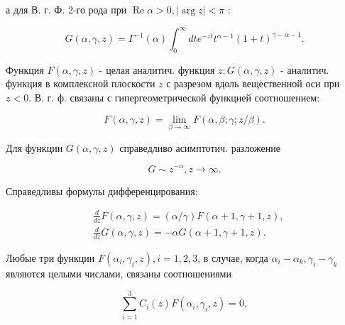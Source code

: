 \documentclass[10pt]{article}
\begin{document}
а для В. г. Ф. 2-го рода при $\operatorname{Re} \alpha>0,|\arg z|<\pi$ :



\[

G(\alpha, \gamma, z)=\Gamma^{-1}(\alpha) \int_{0}^{\infty} d t e^{-z t} t^{\alpha-1}(1+t)^{\gamma-\alpha-1} .

\]



Функция $F(\alpha, \gamma, z)$ - целая аналитич. функция $z ; G(\alpha, \gamma, z)$ - аналитич. функция в комплексной плоскости $z$ с разрезом вдоль вещественной оси при $z<0$. В. г. ф. связаны с гипергеометрической функцией соотношением:



\[

F(\alpha, \gamma, z)=\lim _{\beta \rightarrow \infty} F(\alpha, \beta ; \gamma ; z / \beta) .

\]



Для функции $G(\alpha, \gamma, z)$ справедливо асимптотич. разложение



\[

G \sim z^{-\alpha}, z \rightarrow \infty .

\]



Справедливы формулы дифференцирования:



\[

\begin{aligned}

& \frac{d}{d z} F(\alpha, \gamma, z)=(\alpha / \gamma) F(\alpha+1, \gamma+1, z), \\

& \frac{d}{d z} G(\alpha, \gamma, z)=-\alpha G(\alpha+1, \gamma+1, z) .

\end{aligned}

\]



Любые три функции $F\left(\alpha_{i}, \gamma_{i}, z\right), i=1,2,3$, в случае, когда $\alpha_{i}-\alpha_{k}, \gamma_{i}-\gamma_{k}$ являются целыми числами, связаны соотношениями



\[

\sum_{i=1}^{3} C_{i}(z) F\left(\alpha_{i}, \gamma_{i}, z\right)=0,

\]
\end{document}
